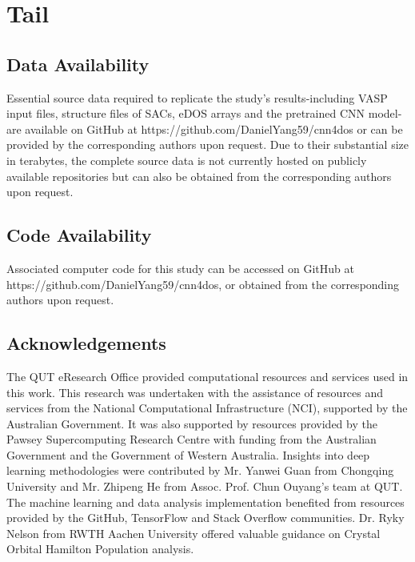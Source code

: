 

\section{Tail}

\subsection{Data Availability}
Essential source data required to replicate the study's results-including VASP input files,
structure files of SACs, eDOS arrays and the pretrained CNN model-are available on GitHub
at https://github.com/DanielYang59/cnn4dos or can be provided by the corresponding authors upon request.
Due to their substantial size in terabytes, the complete source data is not currently hosted on publicly available repositories but can also be obtained from the corresponding authors upon request.


\subsection{Code Availability}
Associated computer code for this study can be accessed on GitHub at https://github.com/DanielYang59/cnn4dos,
or obtained from the corresponding authors upon request.


 \subsection{Acknowledgements}
The QUT eResearch Office provided computational resources and services used in this work.
This research was undertaken with the assistance of resources and services from the National Computational Infrastructure (NCI), supported by the Australian Government.
It was also supported by resources provided by the Pawsey Supercomputing Research Centre with funding from the Australian Government and the Government of Western Australia.
Insights into deep learning methodologies were contributed by Mr. Yanwei Guan from Chongqing University and Mr. Zhipeng He from Assoc. Prof. Chun Ouyang's team at QUT.
The machine learning and data analysis implementation benefited from resources provided by the GitHub, TensorFlow and Stack Overflow communities.
Dr. Ryky Nelson from RWTH Aachen University offered valuable guidance on Crystal Orbital Hamilton Population analysis.


